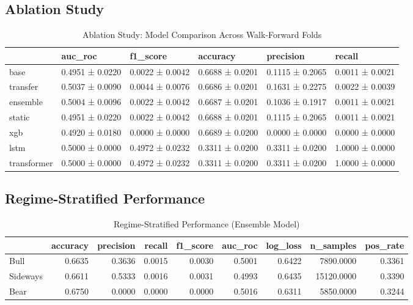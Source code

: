 \documentclass[12pt,a4paper]{article}
\begin{document}
\subsection{Ablation Study}

\begin{table}
\caption{Ablation Study: Model Comparison Across Walk-Forward Folds}
\label{tab:ablation}
\begin{tabular}{llllll}
\toprule
 & auc_roc & f1_score & accuracy & precision & recall \\
\midrule
base & 0.4951 ± 0.0220 & 0.0022 ± 0.0042 & 0.6688 ± 0.0201 & 0.1115 ± 0.2065 & 0.0011 ± 0.0021 \\
transfer & 0.5037 ± 0.0090 & 0.0044 ± 0.0076 & 0.6686 ± 0.0201 & 0.1631 ± 0.2275 & 0.0022 ± 0.0039 \\
ensemble & 0.5004 ± 0.0096 & 0.0022 ± 0.0042 & 0.6687 ± 0.0201 & 0.1036 ± 0.1917 & 0.0011 ± 0.0021 \\
static & 0.4951 ± 0.0220 & 0.0022 ± 0.0042 & 0.6688 ± 0.0201 & 0.1115 ± 0.2065 & 0.0011 ± 0.0021 \\
xgb & 0.4920 ± 0.0180 & 0.0000 ± 0.0000 & 0.6689 ± 0.0200 & 0.0000 ± 0.0000 & 0.0000 ± 0.0000 \\
lstm & 0.5000 ± 0.0000 & 0.4972 ± 0.0232 & 0.3311 ± 0.0200 & 0.3311 ± 0.0200 & 1.0000 ± 0.0000 \\
transformer & 0.5000 ± 0.0000 & 0.4972 ± 0.0232 & 0.3311 ± 0.0200 & 0.3311 ± 0.0200 & 1.0000 ± 0.0000 \\
\bottomrule
\end{tabular}
\end{table}


\subsection{Regime-Stratified Performance}

\begin{table}
\caption{Regime-Stratified Performance (Ensemble Model)}
\label{tab:regime}
\begin{tabular}{lrrrrrrrr}
\toprule
 & accuracy & precision & recall & f1_score & auc_roc & log_loss & n_samples & pos_rate \\
\midrule
Bull & 0.6635 & 0.3636 & 0.0015 & 0.0030 & 0.5001 & 0.6422 & 7890.0000 & 0.3361 \\
Sideways & 0.6611 & 0.5333 & 0.0016 & 0.0031 & 0.4993 & 0.6435 & 15120.0000 & 0.3390 \\
Bear & 0.6750 & 0.0000 & 0.0000 & 0.0000 & 0.5016 & 0.6311 & 5850.0000 & 0.3244 \\
\bottomrule
\end{tabular}
\end{table}
\end{document}
